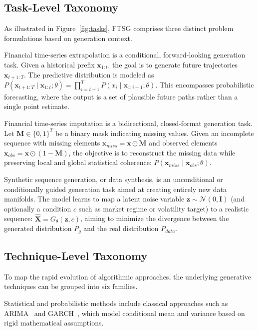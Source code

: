 \documentclass[11pt,a4paper]{article}
\providecommand{\DIFaddbegin}{} %
\providecommand{\DIFaddend}{} %
\providecommand{\DIFdelbegin}{} %
\providecommand{\DIFdelend}{} %
\providecommand{\DIFscaledelfig}{0.5}
\newlength{\DIFdelgraphicswidth} %
\newlength{\DIFdelgraphicsheight} %
\providecommand{\DIFaddincludegraphics}[2][]{{\color{blue}\fbox{\DIFOincludegraphics[#1]{#2}}}} %
\providecommand{\DIFdelincludegraphics}[2][]{%
\sbox{\DIFdelgraphicsbox}{\DIFOincludegraphics[#1]{#2}}%
\settoboxwidth{\DIFdelgraphicswidth}{\DIFdelgraphicsbox} %
\settoboxtotalheight{\DIFdelgraphicsheight}{\DIFdelgraphicsbox} %
\scalebox{\DIFscaledelfig}{%
\parbox[b]{\DIFdelgraphicswidth}{\usebox{\DIFdelgraphicsbox}\\[-\baselineskip] \rule{\DIFdelgraphicswidth}{0em}}\llap{\resizebox{\DIFdelgraphicswidth}{\DIFdelgraphicsheight}{%
\setlength{\unitlength}{\DIFdelgraphicswidth}%
\begin{picture}(1,1)%
\thicklines\linethickness{2pt} %
{\color[rgb]{1,0,0}\put(0,0){\framebox(1,1){}}}%
{\color[rgb]{1,0,0}\put(0,0){\line( 1,1){1}}}%
{\color[rgb]{1,0,0}\put(0,1){\line(1,-1){1}}}%
\end{picture}%
}\hspace*{3pt}}} %
} %
\DeclareRobustCommand{\DIFaddbegin}{\DIFOaddbegin \let\includegraphics\DIFaddincludegraphics} %
\DeclareRobustCommand{\DIFaddend}{\DIFOaddend \let\includegraphics\DIFOincludegraphics} %
\DeclareRobustCommand{\DIFdelbegin}{\DIFOdelbegin \let\includegraphics\DIFdelincludegraphics} %
\DeclareRobustCommand{\DIFdelend}{\DIFOaddend \let\includegraphics\DIFOincludegraphics} %
\begin{document}
\subsection{Task-Level Taxonomy}
As illustrated in Figure~\ref{fig:tasks}, FTSG comprises three distinct problem formulations based on generation context.

Financial time-series extrapolation is a conditional, forward-looking generation task. Given a historical prefix $\mathbf{x}_{1:t}$, the goal is to generate future trajectories $\mathbf{x}_{t+1:T}$. The predictive distribution is modeled as $P(\mathbf{x}_{t+1:T} \mid \mathbf{x}_{1:t}; \theta) = \prod_{i=t+1}^{T} P(x_i \mid \mathbf{x}_{1:i-1}; \theta)$. This encompasses probabilistic forecasting, where the output is a set of plausible future paths rather than a single point estimate.

Financial time-series imputation is a bidirectional, closed-format generation task. Let $\mathbf{M} \in \{0, 1\}^T$ be a binary mask indicating missing values. Given an incomplete sequence with missing elements $\mathbf{x}_{miss} = \mathbf{x} \odot \mathbf{M}$ and observed elements $\mathbf{x}_{obs} = \mathbf{x} \odot (1-\mathbf{M})$, the objective is to reconstruct the missing data while preserving local and global statistical coherence: $P(\mathbf{x}_{miss} \mid \mathbf{x}_{obs}; \theta)$.

Synthetic sequence generation, or data synthesis, is an unconditional or conditionally guided generation task aimed at creating entirely new data manifolds. The model learns to map a latent noise variable $\mathbf{z} \sim \mathcal{N}(0, \mathbf{I})$ (and optionally a condition $c$ such as market regime or volatility target) to a realistic sequence: $\hat{\mathbf{X}} = G_{\theta}(\mathbf{z}, c)$, aiming to minimize the divergence between the generated distribution $P_g$ and the real distribution $P_{data}$.

\subsection{Technique-Level Taxonomy}
To map the rapid evolution of algorithmic approaches, the underlying generative techniques can be grouped into six families.

Statistical and probabilistic methods include classical approaches such as ARIMA~\DIFdelbegin %
\DIFdelend \DIFaddbegin \citep{box2015time} \DIFaddend and GARCH~\citep{bollerslev1986garch}, which model conditional mean and variance based on rigid mathematical assumptions.
\end{document}
